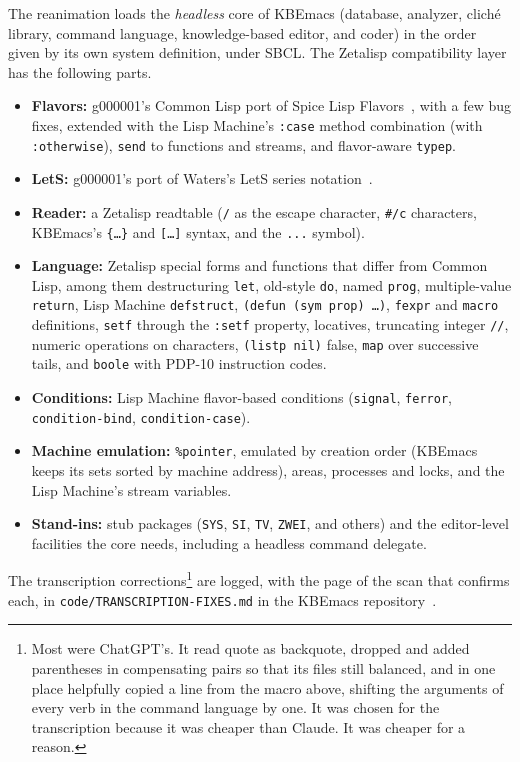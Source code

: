 \documentclass[11pt]{article}
\begin{document}
The reanimation loads the \emph{headless} core of KBEmacs (database,
analyzer, clich\'e library, command language, knowledge-based editor,
and coder) in the order given by its own system definition, under SBCL.
The Zetalisp compatibility layer has the following parts.
\begin{itemize}
\item \textbf{Flavors:} g000001's Common Lisp port of Spice Lisp
  Flavors~\cite{g000001}, with a few bug fixes, extended with the Lisp
  Machine's \texttt{:case} method combination (with
  \texttt{:otherwise}), \texttt{send} to functions and streams, and
  flavor-aware \texttt{typep}.
\item \textbf{LetS:} g000001's port of Waters's LetS series
  notation~\cite{g000001}.
\item \textbf{Reader:} a Zetalisp readtable (\texttt{/} as the escape
  character, \texttt{\#/c} characters, KBEmacs's \texttt{\{\ldots\}}
  and \texttt{[\ldots]} syntax, and the \texttt{...} symbol).
\item \textbf{Language:} Zetalisp special forms and functions that
  differ from Common Lisp, among them destructuring \texttt{let},
  old-style \texttt{do}, named \texttt{prog}, multiple-value
  \texttt{return}, Lisp Machine \texttt{defstruct}, \texttt{(defun (sym
  prop) \ldots)}, \texttt{fexpr} and \texttt{macro} definitions,
  \texttt{setf} through the \texttt{:setf} property, locatives,
  truncating integer \texttt{//}, numeric operations on characters,
  \texttt{(listp nil)} false, \texttt{map} over successive tails, and
  \texttt{boole} with PDP-10 instruction codes.
\item \textbf{Conditions:} Lisp Machine flavor-based conditions
  (\texttt{signal}, \texttt{ferror}, \texttt{condition-bind},
  \texttt{condition-case}).
\item \textbf{Machine emulation:} \texttt{\%pointer}, emulated by
  creation order (KBEmacs keeps its sets sorted by machine address),
  areas, processes and locks, and the Lisp Machine's stream variables.
\item \textbf{Stand-ins:} stub packages (\texttt{SYS}, \texttt{SI},
  \texttt{TV}, \texttt{ZWEI}, and others) and the editor-level
  facilities the core needs, including a headless command delegate.
\end{itemize}
The transcription corrections\footnote{Most were ChatGPT's. It read
quote as backquote, dropped and added parentheses in compensating pairs
so that its files still balanced, and in one place helpfully copied a
line from the macro above, shifting the arguments of every verb in the
command language by one. It was chosen for the transcription because
it was cheaper than Claude. It was cheaper for a reason.} are logged,
with the page of the scan that confirms each, in \texttt{code/TRANSCRIPTION-FIXES.md} in the
KBEmacs repository~\cite{kbemacsrepo}.
\end{document}
